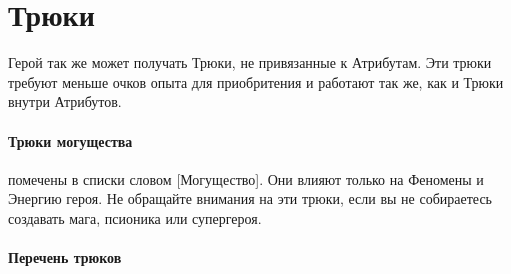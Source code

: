 \section{Трюки}
Герой так же может получать Трюки, не привязанные к Атрибутам. Эти трюки требуют меньше очков опыта для приобритения и работают так же, как и Трюки внутри Атрибутов.
\paragraph{Трюки могущества} помечены в списки словом [Могущество]. Они влияют только на Феномены и Энергию героя. Не обращайте внимания на эти трюки, если вы не собираетесь создавать мага, псионика или супергероя.

\paragraph{Перечень трюков}
